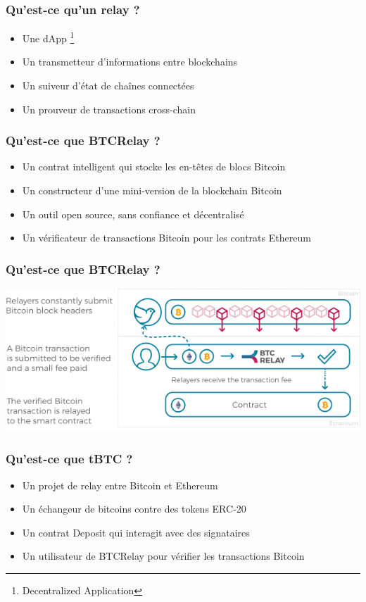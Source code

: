 \begin{frame} 
  \frametitle{Qu’est-ce qu’un relay ?} 
  \begin{itemize} 
    \item Une dApp \footnote{Decentralized Application} 
    \item Un transmetteur d’informations entre blockchains 
    \item Un suiveur d’état de chaînes connectées 
    \item Un prouveur de transactions cross-chain 
  \end{itemize} 
\end{frame}

\begin{frame} 
  \frametitle{Qu’est-ce que BTCRelay ?} 
  \begin{itemize} 
    \item Un contrat intelligent qui stocke les en-têtes de blocs Bitcoin 
    \item Un constructeur d’une mini-version de la blockchain Bitcoin 
    \item Un outil open source, sans confiance et décentralisé 
    \item Un vérificateur de transactions Bitcoin pour les contrats Ethereum 
  \end{itemize} 
\end{frame}

\begin{frame}
  \frametitle{Qu’est-ce que BTCRelay ?}
  \centering
  \includegraphics[scale = 0.5]{decentralisation/btcRelay.png}
\end{frame}

\begin{frame} 
  \frametitle{Qu’est-ce que tBTC ?} 
  \begin{itemize} 
    \item Un projet de relay entre Bitcoin et Ethereum 
    \item Un échangeur de bitcoins contre des tokens ERC-20 
    \item Un contrat Deposit qui interagit avec des signataires 
    \item Un utilisateur de BTCRelay pour vérifier les transactions Bitcoin 
  \end{itemize}
\end{frame}
